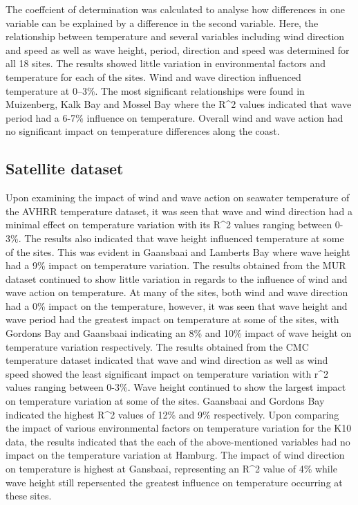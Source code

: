 \documentclass[12pt,a4paper,]{article}
\begin{document}
The coeffcient of determination was calculated to analyse how
differences in one variable can be explained by a difference in the
second variable. Here, the relationship between temperature and several
variables including wind direction and speed as well as wave height,
period, direction and speed was determined for all 18 sites. The results
showed little variation in environmental factors and temperature for
each of the sites. Wind and wave direction influenced temperature at
0--3\%. The most significant relationships were found in Muizenberg,
Kalk Bay and Mossel Bay where the R\^{}2 values indicated that wave
period had a 6-7\% influence on temperature. Overall wind and wave
action had no significant impact on temperature differences along the
coast.

\hypertarget{satellite-dataset}{%
\subsection{Satellite dataset}\label{satellite-dataset}}

Upon examining the impact of wind and wave action on seawater
temperature of the AVHRR temperature dataset, it was seen that wave and
wind direction had a minimal effect on temperature variation with its
R\^{}2 values ranging between 0-3\%. The results also indicated that
wave height influenced temperature at some of the sites. This was
evident in Gaansbaai and Lamberts Bay where wave height had a 9\% impact
on temperature variation. The results obtained from the MUR dataset
continued to show little variation in regards to the influence of wind
and wave action on temperature. At many of the sites, both wind and wave
direction had a 0\% impact on the temperature, however, it was seen that
wave height and wave period had the greatest impact on temperature at
some of the sites, with Gordons Bay and Gaansbaai indicating an 8\% and
10\% impact of wave height on temperature variation respectively. The
results obtained from the CMC temperature dataset indicated that wave
and wind direction as well as wind speed showed the least significant
impact on temperature variation with r\^{}2 values ranging between
0-3\%. Wave height continued to show the largest impact on temperature
variation at some of the sites. Gaansbaai and Gordons Bay indicated the
highest R\^{}2 values of 12\% and 9\% respectively. Upon comparing the
impact of various environmental factors on temperature variation for the
K10 data, the results indicated that the each of the above-mentioned
variables had no impact on the temperature variation at Hamburg. The
impact of wind direction on temperature is highest at Gansbaai,
representing an R\^{}2 value of 4\% while wave height still repersented
the greatest influence on temperature occurring at these sites.
\end{document}
